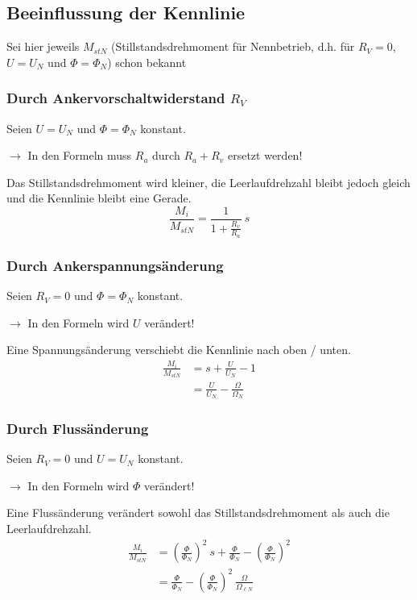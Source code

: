 \documentclass[11pt]{article}
\begin{document}
\subsection*{Beeinflussung der Kennlinie}
Sei hier jeweils $M_{stN}$ (Stillstandsdrehmoment für Nennbetrieb, d.h. für $R_V = 0$, $U = U_N$ und $\Phi = \Phi_N$) schon bekannt

\subsubsection*{Durch Ankervorschaltwiderstand $R_V$}
Seien $U = U_N$ und $\Phi = \Phi_N$ konstant.

\vspace{.5em}
\raggedright
$\rightarrow$ In den Formeln muss $R_a$ durch $R_a + R_v$ ersetzt werden!

\vspace{.5em}
\raggedright
Das Stillstandsdrehmoment wird kleiner, die Leerlaufdrehzahl bleibt jedoch gleich und die Kennlinie bleibt eine Gerade.
\[
	\frac{M_i}{M_{stN}} = \frac{1}{1 + \frac{R_v}{R_a}} ~ s
\]

\subsubsection*{Durch Ankerspannungsänderung}
Seien $R_V = 0$ und $\Phi = \Phi_N$ konstant.

\vspace{.5em}
\raggedright
$\rightarrow$ In den Formeln wird $U$ verändert!

\vspace{.5em}
\raggedright
Eine Spannungsänderung verschiebt die Kennlinie nach oben / unten.
\begin{align*}
	\frac{M_i}{M_{stN}} &= s + \frac{U}{U_N} - 1 \\
		&= \frac{U}{U_N} - \frac{\Omega}{\Omega_N}
\end{align*}

\subsubsection*{Durch Flussänderung}
Seien $R_V = 0$ und $U = U_N$ konstant.

\vspace{.5em}
\raggedright
$\rightarrow$ In den Formeln wird $\Phi$ verändert!

\vspace{.5em}
\raggedright
Eine Flussänderung verändert sowohl das Stillstandsdrehmoment als auch die Leerlaufdrehzahl.
\begin{align*}
	\frac{M_i}{M_{stN}} &= \left(\frac{\Phi}{\Phi_N}\right)^2 ~ s + \frac{\Phi}{\Phi_N} - \left(\frac{\Phi}{\Phi_N} \right)^2 \\
		&= \frac{\Phi}{\Phi_N} - \left(\frac{\Phi}{\Phi_N}\right)^2 ~ \frac{\Omega}{\Omega_{\ell N}}
\end{align*}
\end{document}
